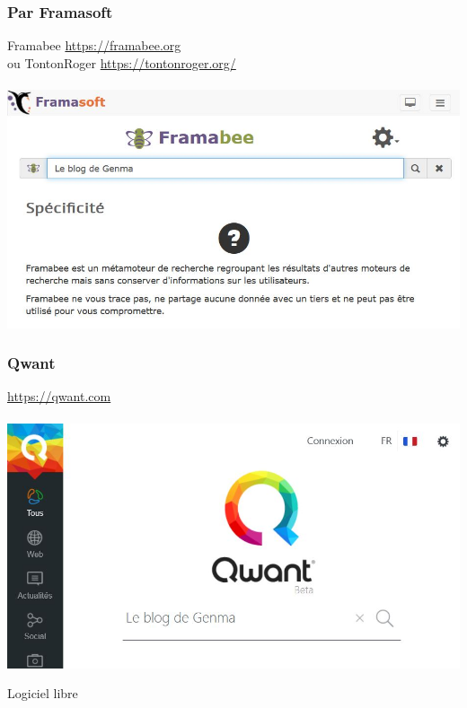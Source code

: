 \documentclass{beamer}
\begin{document}
\begin{frame}
\begin{center}
\frametitle{Par Framasoft}

Framabee \url{https://framabee.org} \\ou TontonRoger \url{https://tontonroger.org/}
\\~\\
\includegraphics[scale=0.6] {./images/Framabee.jpg}
\end{center}
\end{frame}

\begin{frame}
\begin{center}
\frametitle{Qwant}

\url{https://qwant.com}
\\~\\
\includegraphics[scale=0.6] {./images/Qwant.jpg}
\end{center}
\end{frame}

\begin{frame}
\begin{center}
\Huge {Logiciel libre}
\end{center}
\end{frame}
\end{document}

